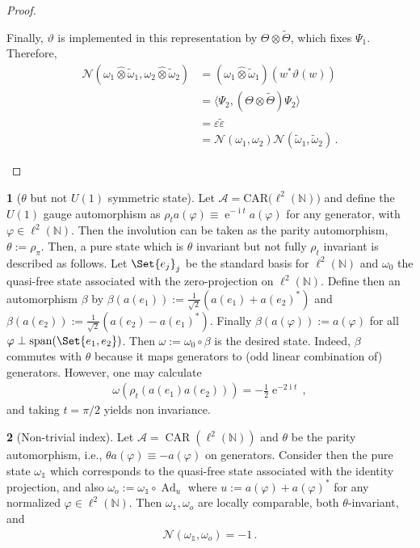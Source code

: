 \documentclass[a4paper,10pt]{article}
\numberwithin{equation}{section}
\theoremstyle{plain}
\theoremstyle{plain}
\theoremstyle{plain}
\theoremstyle{plain}
\theoremstyle{plain}
\theoremstyle{remark}
\theoremstyle{definition}
\newtheorem{example}[example]{\protect\examplename}
\providecommand{\examplename}{Example}
\newcommand{\ee}{\operatorname{e}}
\newcommand{\ii}{\operatorname{i}}
\newcommand{\NN}{\mathbb{N}}
\newcommand{\calA}{\mathcal{A}}
\newcommand{\calN}{\mathcal{N}}
\newcommand{\ip}[2]{\langle #1, #2 \rangle}
\newcommand{\szpan}{\operatorname{span}}
\newcommand{\Ad}[1]{\operatorname{Ad}_{#1}}
\newcommand{\vf}{\varphi}
\newcommand{\Id}{\mathds{1}}
\newcommand{\eq}[1]{\begin{align*}#1\end{align*}}
\newcommand{\br}[1]{\left(#1\right)}
\begin{document}
\begin{proof}
\begin{enumerate}
Finally, \(\vartheta\) is implemented in this representation by
\(\Theta\otimes\widetilde\Theta\), which fixes \(\Psi_1\). Therefore,
\eq{
    \calN\left(
        \omega_1\hat{\otimes}\widetilde{\omega}_1,
        \omega_2\hat{\otimes}\widetilde{\omega}_2
    \right)
    &=
    \left(
        \omega_1\hat{\otimes}\widetilde{\omega}_1
    \right)\left(w^*\vartheta(w)\right)\\
    &=
    \ip{\Psi_2}
       {(\Theta\otimes\widetilde\Theta)\Psi_2}\\
    &=
    \varepsilon\widetilde\varepsilon\\
    &=
    \calN(\omega_1,\omega_2)
    \calN(\widetilde{\omega}_1,\widetilde{\omega}_2)\,.
}

\end{enumerate}
\end{proof}



\begin{example}[$\theta$ but not $U(1)$ symmetric state]
    Let $\calA = \operatorname{CAR(\ell^2(\NN)})$ and define the $U(1)$ gauge automorphism as $\rho_t a(\vf) \equiv \ee^{-\ii t}a(\vf)$ for any generator, with $\vf\in\ell^2(\NN)$. Then the involution can be taken as the parity automorphism, $\theta:=\rho_{\pi}$. Then, a pure state which is $\theta$ invariant but not fully $\rho_t$ invariant is described as follows. Let $\Set{e_j}_j$ be the standard basis for $\ell^2(\NN)$ and $\omega_0$ the quasi-free state associated with the zero-projection on $\ell^2(\NN)$. Define then an automorphism $\beta$ by $\beta(a(e_1)):=\frac{1}{\sqrt{2}}\br{a(e_1)+a(e_2)^\ast}$ and $\beta(a(e_2)):=\frac{1}{\sqrt{2}}\br{a(e_2)-a(e_1)^\ast}$. Finally $\beta(a(\vf)):=a(\vf)$ for all $\vf\perp\szpan(\Set{e_1,e_2})$. Then $\omega:=\omega_0\circ\beta$ is the desired state. Indeed, $\beta$ commutes with $\theta$ because it maps generators to (odd linear combination of) generators. However, one may calculate
    \eq{
    \omega(\rho_t(a(e_1)a(e_2))) = -\frac12\ee^{-2\ii t}\, ,
    } and taking $t=\pi/2$ yields non invariance.
\end{example}
\begin{example}[Non-trivial index]
Let $\calA = \operatorname{CAR}(\ell^2(\NN))$ and $\theta$ be the parity automorphism, i.e., $\theta a(\vf)\equiv -a(\vf)$ on generators. Consider then the pure state $\omega_\Id$ which corresponds to the quasi-free state associated with the identity projection, and also $\omega_o:=\omega_\Id\circ\Ad{u}$ where $u := a(\vf)+a(\vf)^\ast$ for any normalized $\vf\in\ell^2(\NN)$. Then $\omega_\Id,\omega_o$ are locally comparable, both $\theta$-invariant, and 
\eq{
\calN(\omega_\Id,\omega_o) = -1\,.
}
\end{example}
\end{document}
